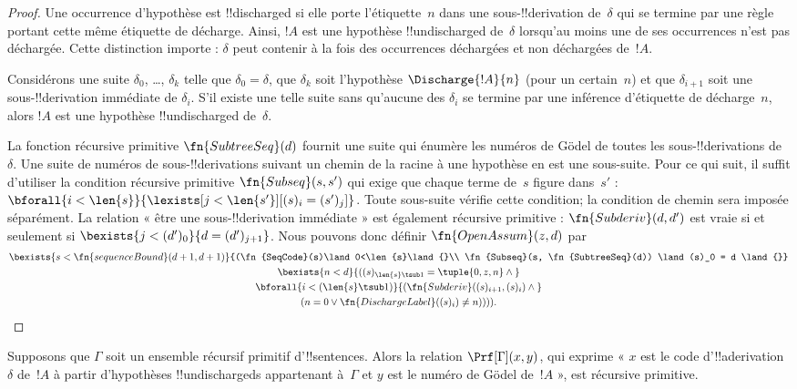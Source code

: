 \documentclass[../../../include/open-logic-section]{subfiles}
\begin{document}
\begin{proof}
  Une occurrence d'hypothèse est !!{discharged} si elle porte
  l'étiquette~$n$ dans une sous-!!{derivation} de~$\delta$ qui se
  termine par une règle portant cette même étiquette de décharge.
  Ainsi, $!A$ est une hypothèse !!{undischarged} de~$\delta$
  lorsqu'au moins une de ses occurrences n'est pas déchargée.
  Cette distinction importe : $\delta$ peut contenir à la fois des
  occurrences déchargées et non déchargées de~$!A$.

  Considérons une suite $\delta_0$, \dots, $\delta_k$ telle que
  $\delta_0 = \delta$, que $\delta_k$ soit l'hypothèse
  $\Discharge{!A}{n}$ (pour un certain~$n$) et que
  $\delta_{i+1}$ soit une sous-!!{derivation} immédiate de
  $\delta_i$. S'il existe une telle suite sans qu'aucune des
  $\delta_i$ se termine par une inférence d'étiquette de
  décharge~$n$, alors $!A$ est une hypothèse !!{undischarged}
  de~$\delta$.

  La fonction récursive primitive $\fn{SubtreeSeq}(d)$ fournit
  une suite qui énumère les numéros de G\"odel de toutes les
  sous-!!{derivation}s de~$\delta$. Une suite de numéros de
  sous-!!{derivation}s suivant un chemin de la racine à une
  hypothèse en est une sous-suite. Pour ce qui suit, il suffit
  d'utiliser la condition récursive primitive
  $\fn{Subseq}(s, s')$ qui exige que chaque terme de~$s$ figure
  dans~$s'$ :
  $\bforall{i<\len{s}}{\lexists[j<\len{s'}][(s)_i = (s')_j]}$.
  Toute sous-suite vérifie cette condition; la condition de chemin
  sera imposée séparément. La relation « être une
  sous-!!{derivation} immédiate » est également récursive
  primitive : $\fn{Subderiv}(d, d')$ est vraie si et seulement si
  $\bexists{j<(d')_0}{d = (d')_{j+1}}$.
  Nous pouvons donc définir $\fn{OpenAssum}(z, d)$ par
  \begin{multline*}
    \bexists{s<\fn{sequenceBound}(d+1,d+1)}{(\fn{SeqCode}(s)\land0<\len{s}\land{}\\ \fn{Subseq}(s, \fn{SubtreeSeq}(d))
      \land (s)_0 = d \land {}} \\
    \bexists{n<d}{((s)_{\len{s} \tsub 1} = \tuple{0, z, n} \land {}}\\
      \bforall{i<(\len{s} \tsub 1)}{(\fn{Subderiv}((s)_{i+1}, (s)_i) \land {}}\\
      (n=0\lor\fn{DischargeLabel}((s)_i) \neq n)))).
  \end{multline*}
\end{proof}

\begin{prop}
  Supposons que $\Gamma$ soit un ensemble récursif primitif
  d'!!{sentence}s. Alors la relation $\Prf[\Gamma](x, y)$, qui
  exprime « $x$ est le code d'!!a{derivation}~$\delta$ de~$!A$ à
  partir d'hypothèses !!{undischarged}s appartenant à~$\Gamma$ et
  $y$ est le numéro de G\"odel de~$!A$ », est récursive primitive.
\end{prop}
\end{document}
